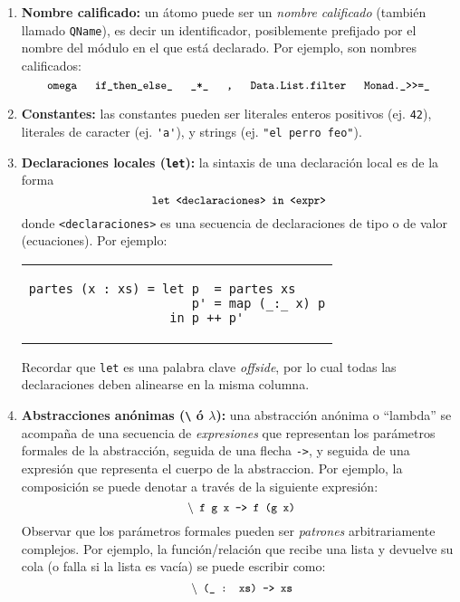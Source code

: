 \begin{enumerate}
\item {\bf Nombre calificado:}
  un átomo puede ser un {\em nombre calificado} (también llamado \verb|QName|),
  es decir un identificador, posiblemente prefijado por el nombre del módulo
  en el que está declarado.
  Por ejemplo, son nombres calificados:
  \[ {\small
      \texttt{omega} \HS
      \texttt{if\_then\_else\_} \HS
      \texttt{\_*\_} \HS
      \texttt{,} \HS
      \texttt{Data.List.filter} \HS
      \verb|Monad._>>=_|
     }
  \]
\item
  {\bf Constantes:}
  las constantes pueden ser literales enteros positivos (ej. \verb|42|),
  literales de caracter (ej. \verb|'a'|),
  y strings (ej. \verb|"el perro feo"|).
\item
  {\bf Declaraciones locales (\verb|let|):}
  la sintaxis de una declaración local es de la forma
  \[ {\small \texttt{let <declaraciones> in <expr>}} \]
  donde \verb|<declaraciones>| es una secuencia de declaraciones
  de tipo o de valor (ecuaciones). Por ejemplo:
      \begin{center}
      \begin{tabular}{l}
      \begin{lstlisting}
partes (x : xs) = let p  = partes xs
                      p' = map (_:_ x) p
                   in p ++ p'
      \end{lstlisting}
      \end{tabular}
      \end{center}
   Recordar que \verb|let| es una palabra clave {\em offside},
   por lo cual todas las declaraciones deben alinearse en la misma
   columna.
\item
  {\bf Abstracciones anónimas (\verb|\| ó $\lambda$):}
  una abstracción anónima o ``lambda'' se acompaña
  de una secuencia de {\em expresiones} que representan los parámetros
  formales de la abstracción, seguida de una flecha \verb|->|,
  y seguida de una expresión que representa el cuerpo de la abstraccion.
  Por ejemplo, la composición se puede denotar a través de la siguiente
  expresión:
  \[ {\small \texttt{ $\backslash$ f g x ->  f (g x)}} \]
  Observar que los parámetros formales pueden ser {\em patrones}
  arbitrariamente complejos. Por ejemplo, la función/relación que recibe
  una lista y devuelve su cola (o falla si la lista es vacía) se puede escribir como:
  \[ {\small \texttt{ $\backslash$ (\_ : xs) ->  xs}} \]


\end{enumerate}
